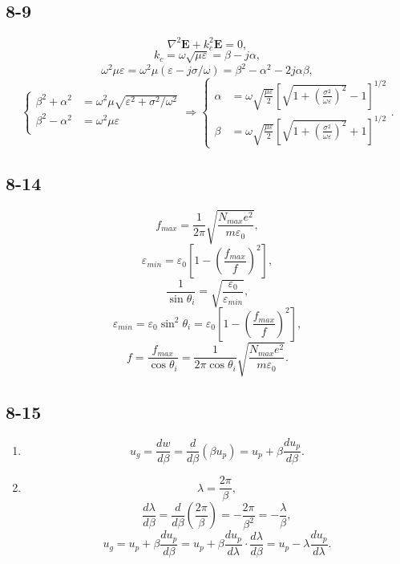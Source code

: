 \documentclass[11pt,a4paper]{article}
\begin{document}
\subsection{8-9}
$$\nabla^2\mathbf{E}+k_c^2\mathbf{E}=0,$$
$$k_c=\omega\sqrt{\mu\varepsilon}=\beta-j\alpha,$$
$$\omega^2\mu\varepsilon=\omega^2\mu(\varepsilon-j\sigma/\omega)=\beta^2-\alpha^2-2j\alpha\beta,$$
$$\left\{\begin{aligned}
\beta^2+\alpha^2&=\omega^2\mu\sqrt{\varepsilon^2+\sigma^2/\omega^2}\\
\beta^2-\alpha^2&=\omega^2\mu\varepsilon\\
\end{aligned}\right.\Longrightarrow\left\{\begin{aligned}
\alpha&=\omega\sqrt{\frac{\mu\varepsilon}{2}}\left[\sqrt{1+\left(\frac{\sigma^2}{\omega\varepsilon}\right)^2}-1\right]^{1/2}\\
\beta&=\omega\sqrt{\frac{\mu\varepsilon}{2}}\left[\sqrt{1+\left(\frac{\sigma^2}{\omega\varepsilon}\right)^2}+1\right]^{1/2}
\end{aligned}\right..$$

\subsection{8-14}
$$f_{max}=\frac{1}{2\pi}\sqrt{\frac{N_{max}e^2}{m\varepsilon_0}},$$
$$\varepsilon_{min}=\varepsilon_0\left[1-\left(\frac{f_{max}}{f}\right)^2\right],$$
$$\frac{1}{\sin\theta_i}=\sqrt{\frac{\varepsilon_0}{\varepsilon_{min}}},$$
$$\varepsilon_{min}=\varepsilon_0\sin^2\theta_i=\varepsilon_0\left[1-\left(\frac{f_{max}}{f}\right)^2\right],$$
$$f=\frac{f_{max}}{\cos\theta_i}=\frac{1}{2\pi\cos\theta_i}\sqrt{\frac{N_{max}e^2}{m\varepsilon_0}}.$$

\subsection{8-15}
\begin{enumerate}[label=\alph*)]
\item
$$u_g=\frac{dw}{d\beta}=\frac{d}{d\beta}(\beta u_p)=u_p+\beta\frac{du_p}{d\beta}.$$
\item
$$\lambda=\frac{2\pi}{\beta},$$
$$\frac{d\lambda}{d\beta}=\frac{d}{d\beta}\left(\frac{2\pi}{\beta}\right)=-\frac{2\pi}{\beta^2}=-\frac{\lambda}{\beta},$$
$$u_g=u_p+\beta\frac{du_p}{d\beta}=u_p+\beta\frac{du_p}{d\lambda}\cdot\frac{d\lambda}{d\beta}=u_p-\lambda\frac{du_p}{d\lambda}.$$
\end{enumerate}
\end{document}
